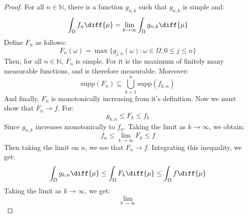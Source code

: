             \begin{proof}
                For all $n\in\mathbb{N}$, there is a function
                $g_{n,k}$ such that $g_{n,k}$ is simple and:
                \begin{equation}
                    \int_{\Omega}f_{n}\diff{\mu}=
                    \underset{k\rightarrow\infty}{\lim}
                    \int_{\Omega}g_{n,k}\diff{\mu}
                \end{equation}
                Define $F_{n}$ as follows:
                \begin{equation}
                    F_{n}(\omega)=
                    \max\{g_{j,n}(\omega):
                        \omega\in\Omega,0\leq{j}\leq{n}\}
                \end{equation}
                Then, for all $n\in\mathbb{N}$, $F_{n}$ is simple.
                For it is the maximum of finitely many measurable
                functions, and is therefore measurable. Moreover:
                \begin{equation}
                    \mathrm{supp}(F_{n})\subseteq
                    \bigcup_{k=1}^{n}\mathrm{supp}(f_{k,n})
                \end{equation}
                And finally, $F_{n}$ is monotonically increasing from
                it's definition. Now we must show that
                $F_{n}\rightarrow{f}$. For:
                \begin{equation}
                    g_{k,n}\leq{F}_{k}\leq{f}_{k}
                \end{equation}
                Since $g_{n,k}$ increases monotonically to $f_{n}$.
                Taking the limit as $k\rightarrow\infty$, we obtain:
                \begin{equation}
                    f_{n}\leq\underset{k\rightarrow\infty}{\lim}F_{k}
                    \leq{f}
                \end{equation}
                Then taking the limit on $n$, we see that
                $F_{n}\rightarrow{f}$. Integrating this inequality, we
                get:
                \begin{equation}
                    \int_{\Omega}g_{k,n}\diff{\mu}
                    \leq\int_{\Omega}F_{k}\diff{\mu}
                    \leq\int_{\Omega}f\diff{\mu}
                \end{equation}
                Taking the limit as $k\rightarrow\infty$, we get:
                \begin{equation}
                    \underset{k\rightarrow\infty}{\lim}

\end{equation}
\end{proof}
